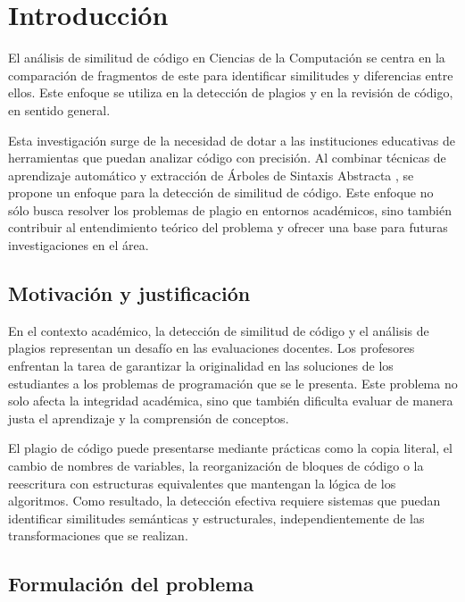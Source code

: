 \chapter*{Introducción}\label{chapter:introduction}

El análisis de similitud de código en Ciencias de la Computación se centra en la comparación de fragmentos de este para identificar similitudes y diferencias entre ellos. Este enfoque se utiliza en la detección de plagios y en la revisión de código, en sentido general. 

Esta investigación surge de la necesidad de dotar a las instituciones educativas de herramientas que puedan analizar código con precisión. Al combinar técnicas de aprendizaje autom\'atico \cite{Goodfellow-et-al-2016} y extracci\'on de \'Arboles de Sintaxis Abstracta \cite{baxter1998clone}, se propone un enfoque para la detección de similitud de código. Este enfoque no sólo busca resolver los problemas de plagio en entornos académicos, sino también contribuir al entendimiento teórico del problema y ofrecer una base para futuras investigaciones en el área.  


\section*{Motivación y justificación}

En el contexto académico, la detección de similitud de código y el análisis de plagios representan un desafío en las evaluaciones docentes. Los profesores enfrentan la tarea de garantizar la originalidad en las soluciones de los estudiantes a los problemas de programación que se le presenta. Este problema no solo afecta la integridad académica, sino que también dificulta evaluar de manera justa el aprendizaje y la comprensión de conceptos.  

El plagio de código puede presentarse mediante prácticas como la copia literal, el cambio de nombres de variables, la reorganización de bloques de código o la reescritura con estructuras equivalentes que mantengan la l\'ogica de los algoritmos. Como resultado, la detección efectiva requiere sistemas que puedan identificar similitudes semánticas y estructurales, independientemente de las transformaciones que se realizan.  


\section*{Formulación del problema}

